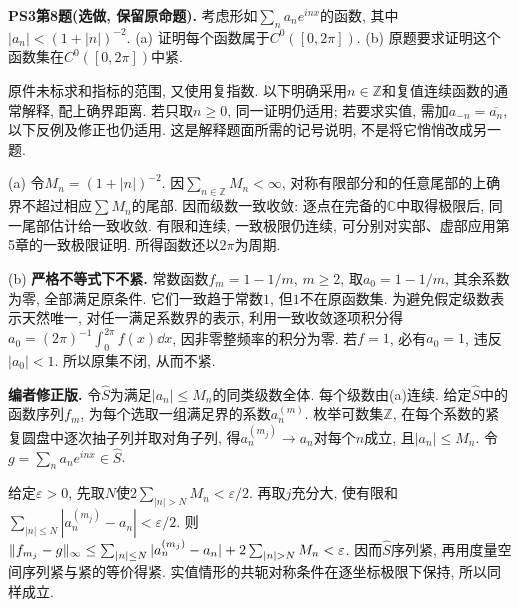 \begin{exercise}\label{ps190:3:8}
\textbf{PS3第8题(选做, 保留原命题).} 考虑形如$\sum_n a_ne^{inx}$的函数, 其中$|a_n|<(1+|n|)^{-2}$. (a) 证明每个函数属于$C^0([0,2\pi])$. (b) 原题要求证明这个函数集在$C^0([0,2\pi])$中紧.
\end{exercise}
\begin{solution}
原件未标求和指标的范围, 又使用复指数. 以下明确采用$n\in\mathbb Z$和复值连续函数的通常解释, 配上确界距离. 若只取$n\ge0$, 同一证明仍适用; 若要求实值, 需加$a_{-n}=\overline{a_n}$, 以下反例及修正也仍适用. 这是解释题面所需的记号说明, 不是将它悄悄改成另一题.

(a) 令$M_n=(1+|n|)^{-2}$. 因$\sum_{n\in\mathbb Z}M_n<\infty$, 对称有限部分和的任意尾部的上确界不超过相应$\sum M_n$的尾部. 因而级数一致收敛: 逐点在完备的$\mathbb C$中取得极限后, 同一尾部估计给一致收敛. 有限和连续, 一致极限仍连续, 可分别对实部、虚部应用第5章的一致极限证明. 所得函数还以$2\pi$为周期.

(b) \textbf{严格不等式下不紧.} 常数函数$f_m=1-1/m$, $m\ge2$, 取$a_0=1-1/m$, 其余系数为零, 全部满足原条件. 它们一致趋于常数$1$, 但$1$不在原函数集. 为避免假定级数表示天然唯一, 对任一满足系数界的表示, 利用一致收敛逐项积分得$a_0=(2\pi)^{-1}\int_0^{2\pi}f(x)\dd x$, 因非零整频率的积分为零. 若$f=1$, 必有$a_0=1$, 违反$|a_0|<1$. 所以原集不闭, 从而不紧.

\textbf{编者修正版.} 令$\widehat S$为满足$|a_n|\le M_n$的同类级数全体. 每个级数由(a)连续. 给定$\widehat S$中的函数序列$f_m$, 为每个选取一组满足界的系数$a_n^{(m)}$. 枚举可数集$\mathbb Z$, 在每个系数的紧复圆盘中逐次抽子列并取对角子列, 得$a_n^{(m_j)}\to a_n$对每个$n$成立, 且$|a_n|\le M_n$. 令$g=\sum_n a_ne^{inx}\in\widehat S$.

给定$\varepsilon>0$, 先取$N$使$2\sum_{|n|>N}M_n<\varepsilon/2$. 再取$j$充分大, 使有限和$\sum_{|n|\le N}|a_n^{(m_j)}-a_n|<\varepsilon/2$. 则$\norm{f_{m_j}-g}_\infty\le\sum_{|n|\le N}|a_n^{(m_j)}-a_n|+2\sum_{|n|>N}M_n<\varepsilon$. 因而$\widehat S$序列紧, 再用度量空间序列紧与紧的等价得紧. 实值情形的共轭对称条件在逐坐标极限下保持, 所以同样成立.
\end{solution}
